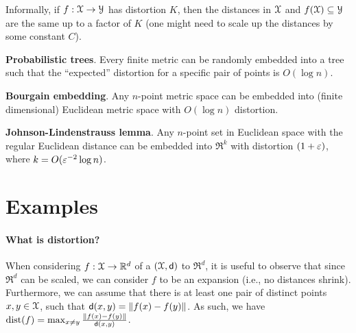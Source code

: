 Informally, if $f:\FMS \to \FMSB$ has distortion $K$, then the
distances in $\FMS$ and $f(\FMS) \subseteq \FMSB$ are the same up to a
factor of $K$ (one might need to scale up the distances by some
constant $C$).



\begin{compactenumI}
    \smallskip%
    \item \textbf{Probabilistic trees}. Every finite metric can be randomly
    embedded into a tree such that the ``expected'' distortion for a
    specific pair of points is $O( \log n)$.

    \smallskip%
    \item \textbf{Bourgain embedding}. Any $n$-point metric space can be
    embedded into (finite dimensional) Euclidean metric space with
    $O( \log n )$ distortion.

    \smallskip%
    \item \textbf{Johnson-Lindenstrauss lemma}. Any $n$-point set in
    Euclidean space with the regular Euclidean distance can be
    embedded into $\Re^k$ with distortion $(1+{\varepsilon})$, where
    $k = O({\varepsilon}^{-2} \log n)$.
\end{compactenumI}



\section{Examples} 


\paragraph*{What is distortion?}
When considering 
$f:\FMS \rightarrow \Re^d$ of a 
$(\FMS,\DistChar)$ to $\Re^d$,
it is useful to observe that
since $\Re^d$ can be scaled, we can consider $f$ to be an expansion
(i.e., no distances shrink).  Furthermore, we can assume that there is
at least one pair of distinct points $x, y \in \FMS$, such that
$\mathsf{d}(x,y) = \left\| {f(x)-f(y)} \right\|$. As such, we have
$\mathrm{dist}(f) = \max_{x\ne y} \frac{\left\| {f(x)-f(y)} \right\|}{\mathsf{d}(x,y)}$.



